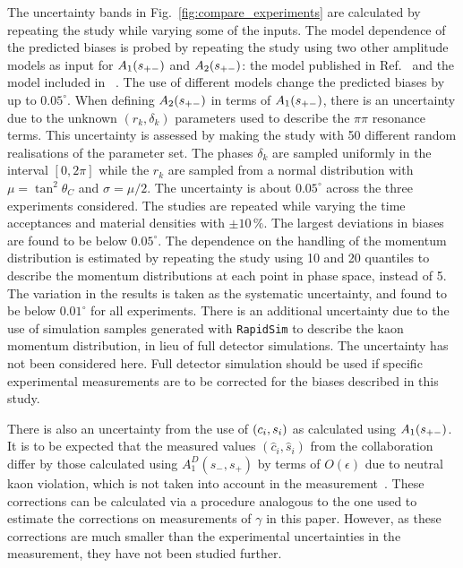 The uncertainty bands in Fig.~\ref{fig:compare_experiments} are calculated by repeating the study while varying some of the inputs. The model dependence of the predicted biases is probed by repeating the study using two other amplitude models as input for $A_1(s_{+-})$ and $A_2(s_{+-})$: the model published in Ref.~\cite{BELLE2010} and the model included in \normalfont~\cite{EvtGen}. The use of different models change the predicted biases by up to $0.05^\circ$. When defining $A_2(s_{+-})$ in terms of $A_1(s_{+-})$, there is an uncertainty due to the unknown $(r_k, \delta_k)$ parameters used to describe the $\pi\pi$ resonance terms. This uncertainty is assessed by making the study with 50 different random realisations of the parameter set. The phases $\delta_k$ are sampled uniformly in the interval $[0, 2\pi]$ while the $r_k$ are sampled from a normal distribution with $\mu=\tan^2\theta_C$ and $\sigma=\mu/2$. The uncertainty is about $0.05^\circ$ across the three experiments considered. The studies are repeated while varying the time acceptances and material densities with $\pm 10\,\%$. The largest deviations in biases are found to be below $0.05^\circ$. The dependence on the handling of the momentum distribution is estimated by repeating the study using 10 and 20 quantiles to describe the momentum distributions at each point in phase space, instead of 5. The variation in the results is taken as the systematic uncertainty, and found to be below $0.01^\circ$ for all experiments. There is an additional uncertainty due to the use of simulation samples generated with \texttt{RapidSim} to describe the kaon momentum distribution, in lieu of full detector simulations. The uncertainty has not been considered here. Full detector simulation should be used if specific experimental measurements are to be corrected for the biases described in this study.

There is also an uncertainty from the use of $(c_i, s_i)$ as calculated using $A_1(s_{+-})$. It is to be expected that the measured values $(\hat c_i, \hat s_i)$ from the \cleo collaboration differ by those calculated using $A_1^D(s_-,s_+)$ by terms of $O(\epsilon)$ due to neutral kaon \CP violation, which is not taken into account in the measurement~\cite{CLEOCISI}. These corrections can be calculated via a procedure analogous to the one used to estimate the corrections on measurements of $\gamma$ in this paper. However, as these corrections are much smaller than the experimental uncertainties in the measurement, they have not been studied further.


